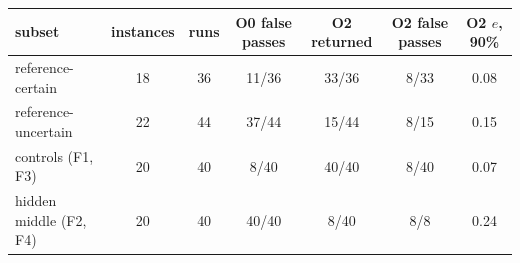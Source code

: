 \begin{tabular}{lcccccc}
\toprule
subset & instances & runs & O0 false passes & O2 returned & O2 false passes & O2 $e$, 90\% \\
\midrule
reference-certain & 18 & 36 & 11/36 & 33/36 & 8/33 & 0.08 \\
reference-uncertain & 22 & 44 & 37/44 & 15/44 & 8/15 & 0.15 \\
controls (F1, F3) & 20 & 40 & 8/40 & 40/40 & 8/40 & 0.07 \\
hidden middle (F2, F4) & 20 & 40 & 40/40 & 8/40 & 8/8 & 0.24 \\
\bottomrule
\end{tabular}
